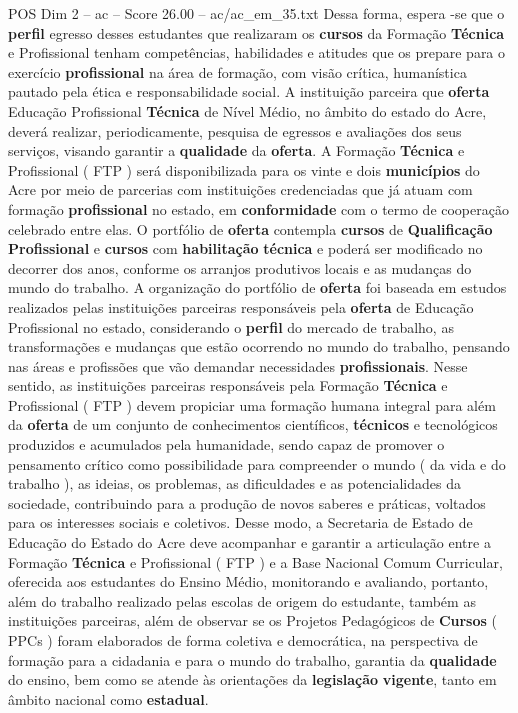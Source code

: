 \begin{textsample}{POS Dim 2 – ac – Score 26.00 – ac/ac\_em\_35.txt}
Dessa forma, espera -se que o \textbf{perfil} egresso desses estudantes que realizaram os \textbf{cursos} da Formação \textbf{Técnica} e Profissional tenham competências, habilidades e atitudes que os prepare para o exercício \textbf{profissional} na área de formação, com visão crítica, humanística pautado pela ética e responsabilidade social.
A instituição parceira que \textbf{oferta} Educação Profissional \textbf{Técnica} de Nível Médio, no âmbito do estado do Acre, deverá realizar, periodicamente, pesquisa de egressos e avaliações dos seus serviços, visando garantir a \textbf{qualidade} da \textbf{oferta}.
A Formação \textbf{Técnica} e Profissional ( FTP ) será disponibilizada para os vinte e dois \textbf{municípios} do Acre por meio de parcerias com instituições credenciadas que já atuam com formação \textbf{profissional} no estado, em \textbf{conformidade} com o termo de cooperação celebrado entre elas.
O portfólio de \textbf{oferta} contempla \textbf{cursos} de \textbf{Qualificação} \textbf{Profissional} e \textbf{cursos} com \textbf{habilitação} \textbf{técnica} e poderá ser modificado no decorrer dos anos, conforme os arranjos produtivos locais e as mudanças do mundo do trabalho.
A organização do portfólio de \textbf{oferta} foi baseada em estudos realizados pelas instituições parceiras responsáveis pela \textbf{oferta} de Educação Profissional no estado, considerando o \textbf{perfil} do mercado de trabalho, as transformações e mudanças que estão ocorrendo no mundo do trabalho, pensando nas áreas e profissões que vão demandar necessidades \textbf{profissionais}.
Nesse sentido, as instituições parceiras responsáveis pela Formação \textbf{Técnica} e Profissional ( FTP ) devem propiciar uma formação humana integral para além da \textbf{oferta} de um conjunto de conhecimentos científicos, \textbf{técnicos} e tecnológicos produzidos e acumulados pela humanidade, sendo capaz de promover o pensamento crítico como possibilidade para compreender o mundo ( da vida e do trabalho ), as ideias, os problemas, as dificuldades e as potencialidades da sociedade, contribuindo para a produção de novos saberes e práticas, voltados para os interesses sociais e coletivos.
Desse modo, a Secretaria de Estado de Educação do Estado do Acre deve acompanhar e garantir a articulação entre a Formação \textbf{Técnica} e Profissional ( FTP ) e a Base Nacional Comum Curricular, oferecida aos estudantes do Ensino Médio, monitorando e avaliando, portanto, além do trabalho realizado pelas escolas de origem do estudante, também as instituições parceiras, além de observar se os Projetos Pedagógicos de \textbf{Cursos} ( PPCs ) foram elaborados de forma coletiva e democrática, na perspectiva de formação para a cidadania e para o mundo do trabalho, garantia da \textbf{qualidade} do ensino, bem como se atende às orientações da \textbf{legislação} \textbf{vigente}, tanto em âmbito nacional como \textbf{estadual}.

\end{textsample}
